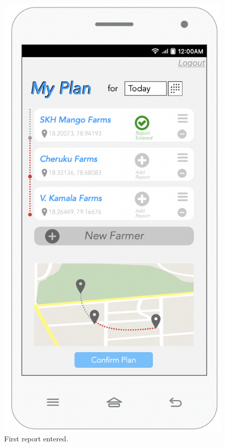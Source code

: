 \begin{multicols}{2}
\begin{figure}[H]
\centering
\includegraphics[scale=0.5]{../images_diagrams/mock_ups/dd/Plan07_OneReport.png}
\caption{\label{fig:mockplan_reportentered}First report entered.}
\end{figure}


\end{multicols}
